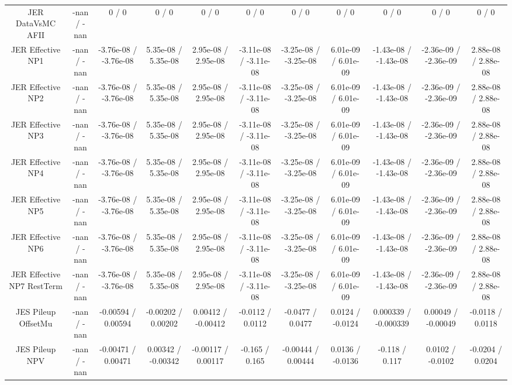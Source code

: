 \begin{table}[htbp]
\begin{center}
\begin{tabular}{|c|c|c|c|c|c|c|c|c|c|c|}
  JER DataVsMC AFII & -nan / -nan & 0 / 0 & 0 / 0 & 0 / 0 & 0 / 0 & 0 / 0 & 0 / 0 & 0 / 0 & 0 / 0 & 0 / 0 \\ 
  JER Effective NP1 & -nan / -nan & -3.76e-08 / -3.76e-08 & 5.35e-08 / 5.35e-08 & 2.95e-08 / 2.95e-08 & -3.11e-08 / -3.11e-08 & -3.25e-08 / -3.25e-08 & 6.01e-09 / 6.01e-09 & -1.43e-08 / -1.43e-08 & -2.36e-09 / -2.36e-09 & 2.88e-08 / 2.88e-08 \\ 
  JER Effective NP2 & -nan / -nan & -3.76e-08 / -3.76e-08 & 5.35e-08 / 5.35e-08 & 2.95e-08 / 2.95e-08 & -3.11e-08 / -3.11e-08 & -3.25e-08 / -3.25e-08 & 6.01e-09 / 6.01e-09 & -1.43e-08 / -1.43e-08 & -2.36e-09 / -2.36e-09 & 2.88e-08 / 2.88e-08 \\ 
  JER Effective NP3 & -nan / -nan & -3.76e-08 / -3.76e-08 & 5.35e-08 / 5.35e-08 & 2.95e-08 / 2.95e-08 & -3.11e-08 / -3.11e-08 & -3.25e-08 / -3.25e-08 & 6.01e-09 / 6.01e-09 & -1.43e-08 / -1.43e-08 & -2.36e-09 / -2.36e-09 & 2.88e-08 / 2.88e-08 \\ 
  JER Effective NP4 & -nan / -nan & -3.76e-08 / -3.76e-08 & 5.35e-08 / 5.35e-08 & 2.95e-08 / 2.95e-08 & -3.11e-08 / -3.11e-08 & -3.25e-08 / -3.25e-08 & 6.01e-09 / 6.01e-09 & -1.43e-08 / -1.43e-08 & -2.36e-09 / -2.36e-09 & 2.88e-08 / 2.88e-08 \\ 
  JER Effective NP5 & -nan / -nan & -3.76e-08 / -3.76e-08 & 5.35e-08 / 5.35e-08 & 2.95e-08 / 2.95e-08 & -3.11e-08 / -3.11e-08 & -3.25e-08 / -3.25e-08 & 6.01e-09 / 6.01e-09 & -1.43e-08 / -1.43e-08 & -2.36e-09 / -2.36e-09 & 2.88e-08 / 2.88e-08 \\ 
  JER Effective NP6 & -nan / -nan & -3.76e-08 / -3.76e-08 & 5.35e-08 / 5.35e-08 & 2.95e-08 / 2.95e-08 & -3.11e-08 / -3.11e-08 & -3.25e-08 / -3.25e-08 & 6.01e-09 / 6.01e-09 & -1.43e-08 / -1.43e-08 & -2.36e-09 / -2.36e-09 & 2.88e-08 / 2.88e-08 \\ 
  JER Effective NP7 RestTerm & -nan / -nan & -3.76e-08 / -3.76e-08 & 5.35e-08 / 5.35e-08 & 2.95e-08 / 2.95e-08 & -3.11e-08 / -3.11e-08 & -3.25e-08 / -3.25e-08 & 6.01e-09 / 6.01e-09 & -1.43e-08 / -1.43e-08 & -2.36e-09 / -2.36e-09 & 2.88e-08 / 2.88e-08 \\ 
  JES Pileup OffsetMu & -nan / -nan & -0.00594 / 0.00594 & -0.00202 / 0.00202 & 0.00412 / -0.00412 & -0.0112 / 0.0112 & -0.0477 / 0.0477 & 0.0124 / -0.0124 & 0.000339 / -0.000339 & 0.00049 / -0.00049 & -0.0118 / 0.0118 \\ 
  JES Pileup NPV & -nan / -nan & -0.00471 / 0.00471 & 0.00342 / -0.00342 & -0.00117 / 0.00117 & -0.165 / 0.165 & -0.00444 / 0.00444 & 0.0136 / -0.0136 & -0.118 / 0.117 & 0.0102 / -0.0102 & -0.0204 / 0.0204 \\ 

\end{tabular}
\end{center}
\end{table}
